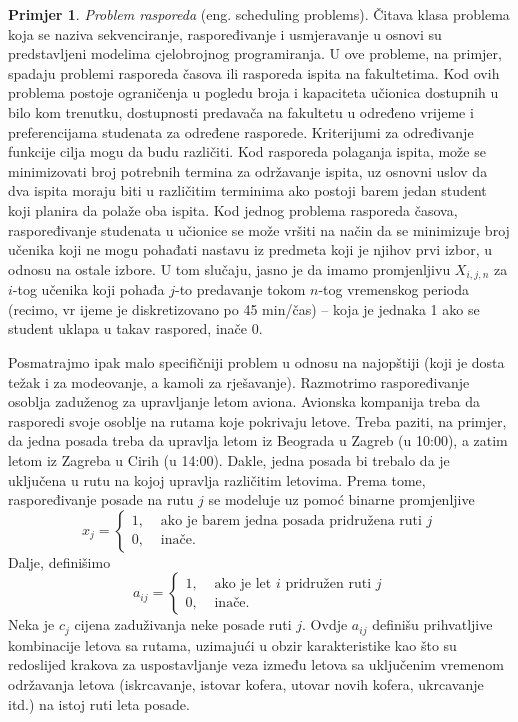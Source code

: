 \documentclass[a4paper, utf8, 11pt, colorlinks]{book}
\theoremstyle{definition}
\newtheorem{primjer}{Primjer}[chapter]
\begin{document}
\begin{primjer}
\emph{Problem rasporeda} (eng. scheduling problems). Čitava klasa problema koja se naziva sekvenciranje, raspoređivanje i usmjeravanje u osnovi su predstavljeni modelima cjelobrojnog programiranja. U ove probleme, na primjer, spadaju problemi rasporeda časova ili rasporeda ispita na fakultetima. Kod ovih problema postoje ograničenja u pogledu broja i kapaciteta učionica dostupnih u bilo kom trenutku, dostupnosti predavača na fakultetu u određeno vrijeme i preferencijama studenata za određene rasporede. Kriterijumi za određivanje funkcije cilja mogu da budu različiti. Kod rasporeda polaganja ispita, može se minimizovati broj potrebnih termina za održavanje ispita, uz osnovni uslov da dva ispita moraju biti u različitim terminima ako postoji barem jedan student koji planira da polaže oba ispita.  Kod jednog problema rasporeda časova, raspoređivanje studenata u  učionice se može vršiti na  način da se minimizuje broj učenika koji ne mogu pohađati nastavu iz predmeta koji je njihov prvi izbor, u odnosu na ostale izbore.
 U tom slučaju, jasno je da imamo promjenljivu $X_{i,j,n}$ za   $i$-tog učenika 
koji pohađa $j$-to predavanje tokom $n$-tog vremenskog perioda (recimo, vr	ijeme je diskretizovano po 45 min/čas) -- koja je jednaka 1 ako se student uklapa u takav raspored, inače 0. 
\end{primjer}
Posmatrajmo ipak malo specifičniji problem u odnosu na najopštiji (koji je dosta težak i za modeovanje, a kamoli za rješavanje). 
Razmotrimo raspoređivanje osoblja zaduženog za upravljanje letom aviona. 
Avionska kompanija treba da rasporedi svoje osoblje na rutama koje pokrivaju letove. Treba paziti, na primjer, da jedna posada treba da upravlja letom iz  Beograda u Zagreb (u 10:00), a zatim letom iz Zagreba u Cirih (u 14:00). Dakle, jedna posada bi trebalo da je uključena u rutu na kojoj upravlja različitim letovima. Prema tome, raspoređivanje posade na rutu $j$ se modeluje uz pomoć binarne promjenljive 
$$x_j = \begin{cases}
    1,& \mbox{ ako je barem jedna posada pridružena ruti } j \\
    0,& \mbox{ inače}. 
\end{cases}
$$
Dalje, definišimo 
$$a_{ij}= \begin{cases}
             1,& \mbox{ ako je let } i \mbox{ pridružen ruti } j \\
             0,& \mbox{ inače}.
        \end{cases}
$$
Neka je $c_j$ cijena zaduživanja neke posade ruti $j$. Ovdje $a_{ij}$ definišu prihvatljive kombinacije letova sa rutama, uzimajući u obzir  karakteristike kao što su redoslijed krakova za uspostavljanje veza između letova sa uključenim vremenom  održavanja letova (iskrcavanje, istovar  kofera, utovar   novih kofera, ukrcavanje itd.) na istoj ruti leta posade.   
\end{document}
